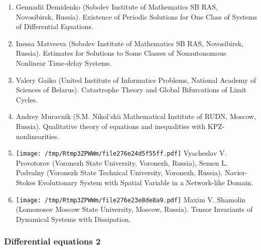 \documentclass[
]{article}
\providecommand{\tightlist}{%
  \setlength{\itemsep}{0pt}\setlength{\parskip}{0pt}}
\begin{document}
\begin{enumerate}
\def\labelenumi{\arabic{enumi}.}
\tightlist
\item
  Gennadii Demidenko (Sobolev Institute of Mathematics SB RAS,
  Novosibirsk, Russia). Existence of Periodic Solutions for One Class of
  Systems of Differential Equations.
\item
  Inessa Matveeva (Sobolev Institute of Mathematics SB RAS, Novosibirsk,
  Russia). Estimates for Solutions to Some Classes of Nonautonomous
  Nonlinear Time-delay Systems.
\item
  Valery Gaiko (United Institute of Informatics Problems, National
  Academy of Sciences of Belarus). Catastrophe Theory and Global
  Bifurcations of Limit Cycles.
\item
  Andrey Muravnik (S.M. Nikol'skii Mathematical Institute of RUDN,
  Moscow, Russia). Qualitative theory of equations and inequalities with
  KPZ-nonlinearities.
\item
  \protect\texttt{[image: /tmp/Rtmp3ZPWWm/file276e24d5f55ff.pdf]}
  Vyacheslav V. Provotorov (Voronezh State University, Voronezh,
  Russia), Semen L. Podvalny (Voronezh State Technical University,
  Voronezh, Russia). Navier-Stokes Evolutionary System with Spatial
  Variable in a Network-like Domain.
\item
  \protect\texttt{[image: /tmp/Rtmp3ZPWWm/file276e23e8de8a9.pdf]}
  Maxim V. Shamolin (Lomonosov Moscow State University, Moscow, Russia).
  Tensor Invariants of Dynamical Systems with Dissipation.
\end{enumerate}

\hypertarget{de2}{%
\subsubsection{Differential equations 2}\label{de2}}
\end{document}
